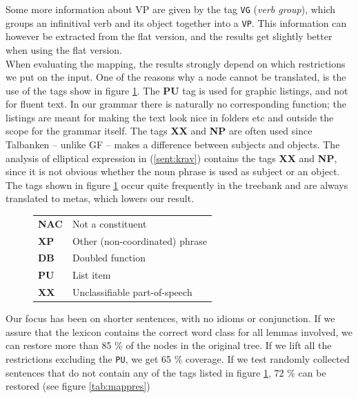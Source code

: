 \documentclass{report}
\begin{document}
Some more information about VP are given by the tag \verb|VG| (\emph{verb group}),
which groups an infinitival verb and its object together into a \verb|VP|.
This information can however be extracted from the flat version, and the results
get slightly better when using the flat version. \\


When evaluating the mapping, the results strongly depend on which restrictions we
put on the input. 
One of the reasons why a node cannot be translated, is the 
use of the tags show in figure \ref{fig:mapBadtag}.
The \textbf{PU} tag is used for graphic listings, and not for fluent text.
In our grammar there is naturally no corresponding function; 
the listings are meant for making the text look nice in
folders etc and outside the scope for the grammar itself. The tags \textbf{XX} and \textbf{NP} are often used since
Talbanken -- unlike GF -- makes a difference between subjects
and objects. %
The analysis of elliptical expression in (\ref{sent:krav})
\label{sent:krav}
contains the tags \textbf{XX} and \textbf{NP}, since it is not obvious
whether the noun phrase is used as subject or an object.
The tags shown in figure \ref{fig:mapBadtag} occur quite frequently in the treebank and are always translated
to metas, which lowers our result. \\
\begin{figure}[h]
\begin{tabular}{ll}
\textbf{NAC} & Not a constituent\\
\textbf{XP} & Other (non-coordinated) phrase\\
\textbf{DB} & Doubled function\\
\textbf{PU} & List item\\
\textbf{XX} & Unclassifiable part-of-speech\\
\end{tabular}
\caption{}\label{fig:mapBadtag}
\end{figure}


Our focus has been on shorter sentences, with no idioms or conjunction.
If we assure that the lexicon contains the correct word class for all lemmas
involved, we
can restore more than 85 \% of the nodes in the original tree.
If we lift all the restrictions excluding the \verb|PU|, we get
65 \% coverage. 
If we test randomly collected sentences that do not contain any of the tags listed
in figure \ref{fig:mapBadtag}, 72 \% can be restored (see figure \ref{tab:mappres})
\end{document}
